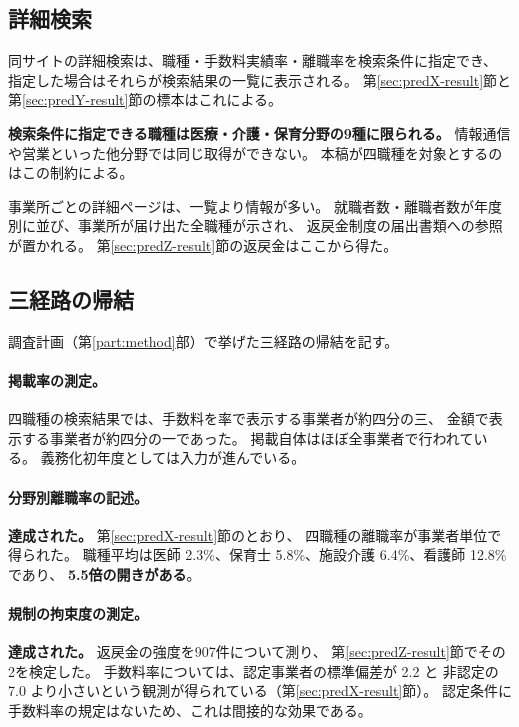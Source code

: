 \subsection{詳細検索}
\label{sec:search-route}

同サイトの詳細検索は、職種・手数料実績率・離職率を検索条件に指定でき、
指定した場合はそれらが検索結果の一覧に表示される。
第\ref{sec:predX-result}節と第\ref{sec:predY-result}節の標本はこれによる。

\textbf{検索条件に指定できる職種は医療・介護・保育分野の9種に限られる。}
情報通信や営業といった他分野では同じ取得ができない。
本稿が四職種を対象とするのはこの制約による。

事業所ごとの詳細ページは、一覧より情報が多い。
就職者数・離職者数が年度別に並び、事業所が届け出た全職種が示され、
返戻金制度の届出書類への参照が置かれる。
第\ref{sec:predZ-result}節の返戻金はここから得た。

\subsection{三経路の帰結}

調査計画（第\ref{part:method}部）で挙げた三経路の帰結を記す。

\paragraph{掲載率の測定。}
四職種の検索結果では、手数料を率で表示する事業者が約四分の三、
金額で表示する事業者が約四分の一であった。
掲載自体はほぼ全事業者で行われている。
義務化初年度としては入力が進んでいる。

\paragraph{分野別離職率の記述。}
\textbf{達成された。} 第\ref{sec:predX-result}節のとおり、
四職種の離職率が事業者単位で得られた。
職種平均は医師 2.3\%、保育士 5.8\%、施設介護 6.4\%、看護師 12.8\% であり、
\textbf{5.5倍の開きがある}。

\paragraph{規制の拘束度の測定。}
\textbf{達成された。} 返戻金の強度を907件について測り、
第\ref{sec:predZ-result}節でその2を検定した。
手数料率については、認定事業者の標準偏差が 2.2 と
非認定の 7.0 より小さいという観測が得られている（第\ref{sec:predX-result}節）。
認定条件に手数料率の規定はないため、これは間接的な効果である。

